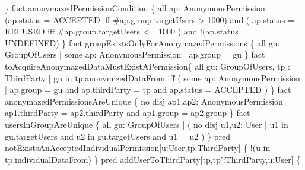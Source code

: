 \documentclass[a4paper]{article}
\begin{document}
{\newline \}
\newline 
\newline fact anonymazedPermissionCondition \{
\newline all ap: AnonymousPermission | (ap.status = ACCEPTED iff 
\newline \#ap.group.targetUsers > 1000) and ( ap.status = REFUSED iff 
\newline \#ap.group.targetUsers <= 1000  ) and !(ap.status = UNDEFINED)
\newline \}
\newline 
\newline fact groupExistsOnlyForAnonymazedPermissions \{
\newline all gu: GroupOfUsers | some ap: AnonymousPermission | ap.group = gu
\newline \}
\newline 
\newline fact toAcquireAnonymazedDataMustExistAPermission\{
\newline all gu: GroupOfUsers, tp : ThirdParty |  gu in \newline tp.anonymizedDataFrom iff ( some ap: AnonymousPermission | ap.group = gu and 
\newline ap.thirdParty = tp and ap.status = ACCEPTED )
\newline \}
\newline 
\newline fact anonymazedPermissionsAreUnique \{
\newline no disj ap1,ap2: AnonymousPermission | \newline ap1.thirdParty = ap2.thirdParty and 
\newline ap1.group = ap2.group
\newline \}
\newline 
\newline fact usersInGroupAreUnique \{
\newline all gu: GroupOfUsers | ( no disj u1,u2: User | u1 in 
\newline gu.targetUsers and u2 in gu.targetUsers and u1 = u2 )
\newline \}
\newline 
\newline pred notExistsAnAcceptedIndividualPermission[u:User,tp:ThirdParty] \{
\newline 	!(u in tp.individualDataFrom)
\newline \}
\newline 
\newline pred addUserToThirdParty[tp,tp':ThirdParty,u:User] \{
}
\end{document}
